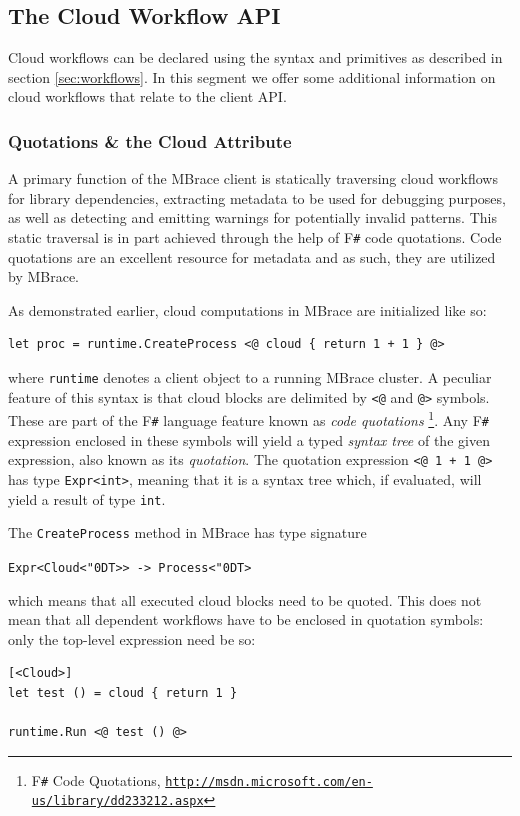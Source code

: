 \documentclass[9pt,a4paper]{article}
\newcommand{\mbrace}{MBrace}
\newcommand{\fsharp}{F\texttt \#}
\newcommand{\samehref}[1]{\href{#1}{\texttt{#1}}}
\newcommand{\centertt}[1]{\begin{center}\texttt{#1}\end{center}}
\newcommand{\uq}{\char"0D}
\begin{document}
\subsection{The Cloud Workflow API}
\label{sec:client:workflows}

Cloud workflows can be declared using the syntax and primitives as described in section \ref{sec:workflows}.
In this segment we offer some additional information on cloud workflows that relate to the client API.

\subsubsection*{Quotations \& the Cloud Attribute}

A primary function of the \mbrace{} client is statically traversing cloud workflows 
for library dependencies, extracting metadata to be used for debugging purposes,
as well as detecting and emitting warnings for potentially invalid patterns. 
This static traversal is in part achieved through the help of \fsharp{} code quotations.
Code quotations are an excellent resource for metadata and as such, they are utilized by \mbrace{}.

As demonstrated earlier, cloud computations in \mbrace{} are initialized like so:
\begin{lstlisting}
let proc = runtime.CreateProcess <@ cloud { return 1 + 1 } @>
\end{lstlisting}
where \texttt{runtime} denotes a client object to a running \mbrace{} cluster.
A peculiar feature of this syntax is that cloud blocks are delimited by \texttt{<@} and 
\texttt{@>} symbols. These are part of the \fsharp{} language feature known as \emph{code quotations}%
\footnote{\fsharp{} Code Quotations, \samehref{http://msdn.microsoft.com/en-us/library/dd233212.aspx}}.
Any \fsharp{} expression enclosed in these symbols will yield a
typed \emph{syntax tree} of the given expression, also known as its \emph{quotation}.
The quotation expression \texttt{<@ 1 + 1 @>} has type \texttt{Expr<int>}, 
meaning that it is a syntax tree which, if evaluated, 
will yield a result of type \texttt{int}.

The \texttt{CreateProcess} method in \mbrace{} has type signature
\centertt{Expr<Cloud<\uq{}T>> -> Process<\uq{}T>}
which means that all executed cloud blocks need to be quoted.
This does not mean that all dependent workflows have to be enclosed in quotation symbols:
only the top-level expression need be so:
\begin{lstlisting}
[<Cloud>]
let test () = cloud { return 1 }

runtime.Run <@ test () @>
\end{lstlisting}
\end{document}
